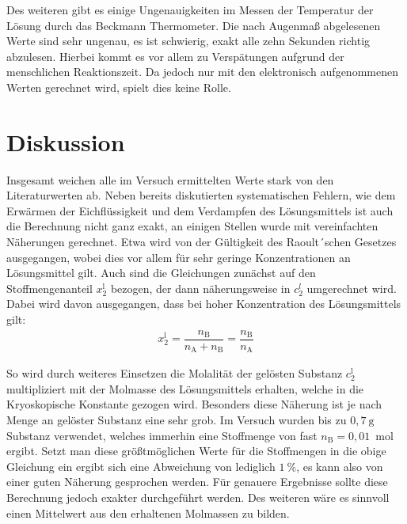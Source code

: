 \documentclass[12pt,a4paper,titlepage,headinclude,bibtotoc]{scrartcl}
\begin{document}
Des weiteren gibt es einige Ungenauigkeiten im Messen der Temperatur der Lösung durch das Beckmann Thermometer. Die nach Augenmaß abgelesenen Werte sind sehr ungenau, es ist schwierig, exakt alle zehn Sekunden richtig abzulesen. Hierbei kommt es vor allem zu Verspätungen aufgrund der menschlichen Reaktionszeit. Da jedoch nur mit den elektronisch aufgenommenen Werten gerechnet wird, spielt dies keine Rolle.

\section{Diskussion}

Insgesamt weichen alle im Versuch ermittelten Werte stark von den Literaturwerten ab. Neben bereits diskutierten systematischen Fehlern, wie dem Erwärmen der Eichflüssigkeit und dem Verdampfen des Lösungsmittels ist auch die Berechnung nicht ganz exakt, an einigen Stellen wurde mit vereinfachten Näherungen gerechnet. Etwa wird von der Gültigkeit des Raoult´schen Gesetzes ausgegangen, wobei dies vor allem für sehr geringe Konzentrationen an Lösungsmittel gilt. Auch sind die Gleichungen zunächst auf den Stoffmengenanteil $x_2^\mathrm{l}$ bezogen, der dann näherungsweise in $c_2^l$ umgerechnet wird. Dabei wird davon ausgegangen, dass bei hoher Konzentration des Lösungsmittels gilt:
\begin{align}
x_2^\mathrm{l} = \dfrac{n_\mathrm{B}}{n_\mathrm{A} + n_\mathrm{B}} = \dfrac{n_\mathrm{B}}{n_\mathrm{A}}
\end{align}   

So wird durch weiteres Einsetzen die Molalität der gelösten Substanz $c_2^\mathrm{l}$ multipliziert mit der Molmasse des Lösungsmittels erhalten, welche in die Kryoskopische Konstante gezogen wird. Besonders diese Näherung ist je nach Menge an gelöster Substanz eine sehr grob. Im Versuch wurden bis zu $0,7{~}\mathrm{g}$ Substanz verwendet, welches immerhin eine Stoffmenge von fast $n_\mathrm{B} = 0,01${~}mol ergibt. Setzt man diese größtmöglichen Werte für die Stoffmengen in die obige Gleichung ein ergibt sich eine Abweichung von lediglich $1 {~} \% $, es kann also von einer guten Näherung gesprochen werden. Für genauere Ergebnisse sollte diese Berechnung jedoch exakter durchgeführt werden. Des weiteren wäre es sinnvoll einen Mittelwert aus den erhaltenen Molmassen zu bilden.  
 


 
\end{document}
